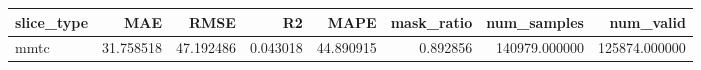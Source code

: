\begin{tabular}{lrrrrrrr}
\toprule
slice_type & MAE & RMSE & R2 & MAPE & mask_ratio & num_samples & num_valid \\
\midrule
mmtc & 31.758518 & 47.192486 & 0.043018 & 44.890915 & 0.892856 & 140979.000000 & 125874.000000 \\
\bottomrule
\end{tabular}
